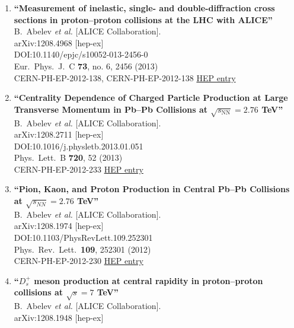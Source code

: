 \begin{enumerate}
\item%
{\bf ``Measurement of inelastic, single- and double-diffraction cross sections in proton--proton collisions at the LHC with ALICE''}
  \\{}B.~Abelev {\it et al.} [ALICE Collaboration].
  \\{}arXiv:1208.4968 [hep-ex]
  \\{}DOI:10.1140/epjc/s10052-013-2456-0
  \\{}Eur.\ Phys.\ J.\ C {\bf 73}, no. 6, 2456 (2013)
  \\{}CERN-PH-EP-2012-138, CERN-PH-EP-2012-138
\href{http://inspirehep.net/record/1181770}{HEP entry}
\item%
{\bf ``Centrality Dependence of Charged Particle Production at Large Transverse Momentum in Pb--Pb Collisions at $\sqrt{s_{\mathrm{NN}}} = 2.76$ TeV''}
  \\{}B.~Abelev {\it et al.} [ALICE Collaboration].
  \\{}arXiv:1208.2711 [hep-ex]
  \\{}DOI:10.1016/j.physletb.2013.01.051
  \\{}Phys.\ Lett.\ B {\bf 720}, 52 (2013)
  \\{}CERN-PH-EP-2012-233
\href{http://inspirehep.net/record/1127497}{HEP entry}
\item%
{\bf ``Pion, Kaon, and Proton Production in Central Pb--Pb Collisions at \linebreak $\sqrt{s_{NN}} = 2.76$ TeV''}
  \\{}B.~Abelev {\it et al.} [ALICE Collaboration].
  \\{}arXiv:1208.1974 [hep-ex]
  \\{}DOI:10.1103/PhysRevLett.109.252301
  \\{}Phys.\ Rev.\ Lett.\  {\bf 109}, 252301 (2012)
  \\{}CERN-PH-EP-2012-230
\href{http://inspirehep.net/record/1126966}{HEP entry}
\item%
{\bf ``$D_{s}^+$ meson production at central rapidity in proton--proton collisions at $\sqrt{s}=7$ TeV''}
  \\{}B.~Abelev {\it et al.} [ALICE Collaboration].
  \\{}arXiv:1208.1948 [hep-ex]

\end{enumerate}
